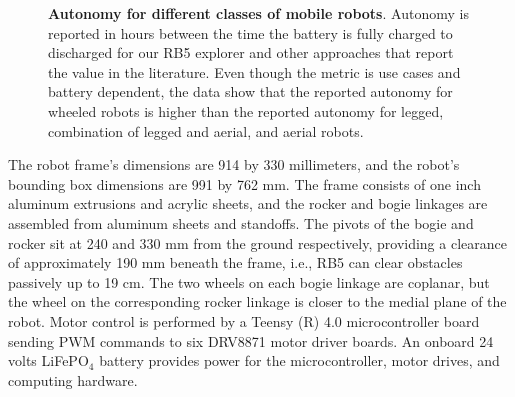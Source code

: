 \documentclass[letterpaper,10pt,conference,twoside]{IEEEtran}
\theoremstyle{definition}
\begin{document}
\begin{figure}[t]
  \vspace*{-.45cm}
  \begin{minipage}[t]{0.58\columnwidth}
    \hspace*{-.5cm}
    
  \end{minipage}\hfill
  \begin{minipage}[t]{0.41\columnwidth}
    \vspace*{-5.1cm}
    \centering
    \caption[Autonomy for different classes of mobile robots]{%
    \textbf{Autonomy for different classes of mobile robots}. 
    Autonomy is reported in hours between the time the battery is fully charged to discharged for our RB5 explorer and other approaches that report the value in the literature. Even though the metric is use cases and battery dependent, the data show that the reported autonomy for wheeled robots is higher than the reported autonomy for legged, combination of legged and aerial, and aerial robots.
    }
    \label{fig}
  \end{minipage}
  \vspace*{-1cm}
\end{figure}

The robot frame's dimensions are 914 by 330 millimeters, and the robot's bounding box dimensions are 991 by 762 mm. The frame consists of one inch aluminum extrusions and acrylic sheets, and the rocker and bogie linkages are assembled from aluminum sheets and standoffs. The pivots of the bogie and rocker sit at 240 and 330 mm from the ground respectively, providing a clearance of approximately 190 mm beneath the frame, i.e., RB5 can clear obstacles passively up to 19 cm. The two wheels on each bogie linkage are coplanar, but the wheel on the corresponding rocker linkage is closer to the medial plane of the robot. Motor control is performed by a Teensy (R) 4.0 microcontroller board sending PWM commands to six DRV8871 motor driver boards. An onboard 24 volts LiFePO${}_\text{4}$ battery provides power for the microcontroller, motor drives, and computing hardware.
\end{document}

